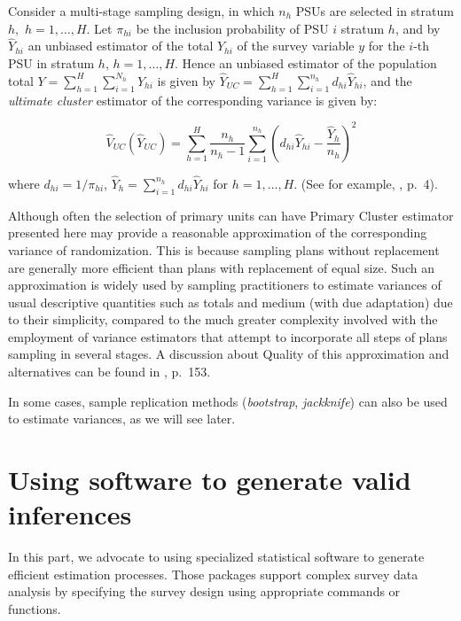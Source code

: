 \documentclass[
  12pt,
]{book}
\begin{document}
Consider a multi-stage sampling design, in which \(n_{h}\) PSUs are selected in stratum \(h,\) \(h=1,\ldots ,H\). Let \(\pi_{hi}\) be the inclusion probability of PSU \(i\) stratum \(h\), and by \(\widehat{Y}_{hi}\) an unbiased estimator of the total \(Y_{hi}\) of the survey variable \(y\) for the \(i\)-th PSU in stratum \(h\), \(h=1,\ldots ,H\). Hence an unbiased estimator of the population total \(Y = \sum_{h=1}^{H} \sum_{i=1}^{N_{h}} Y_{hi}\) is given by \(\widehat{Y}_{UC} = \sum_{h=1}^{H} \sum_{i=1}^{n_{h}} d_{hi} \widehat{Y}_{hi}\), and the \emph{ultimate cluster} estimator of the corresponding variance is given by:

\[
\widehat{V}_{UC} \left( \widehat{Y}_{UC}\right) = \sum_{h=1}^{H} \frac{n_{h}}
{n_{h}-1} \sum_{i=1}^{n_{h}} \left( d_{hi} \widehat{Y}_{hi} - \frac{\widehat{Y}_{h}}{n_{h}} \right) ^{2}
\]

where \(d_{hi} = 1 / \pi_{hi}\), \(\widehat{Y}_{h} = \sum_{i=1}^{n_{h}} d_{hi} \widehat{Y}_{hi}\) for \(h=1,\ldots ,H\). (See for example, \citep{Shah1993}, p.~4).

Although often the selection of primary units can have Primary Cluster estimator presented here may provide a reasonable approximation of the corresponding variance of randomization. This is because sampling plans without replacement are generally more efficient than plans with replacement of equal size. Such an approximation is widely used by sampling practitioners to estimate variances of usual descriptive quantities such as totals and medium (with due adaptation) due to their simplicity, compared to the much greater complexity involved with the employment of variance estimators that attempt to incorporate all steps of plans sampling in several stages. A discussion about Quality of this approximation and alternatives can be found in \citep{SSW92}, p.~153.

In some cases, sample replication methods (\emph{bootstrap}, \emph{jackknife}) can also be used to estimate variances, as we will see later.

\hypertarget{using-software-to-generate-valid-inferences}{%
\section{Using software to generate valid inferences}\label{using-software-to-generate-valid-inferences}}

In this part, we advocate to using specialized statistical software to generate efficient estimation processes. Those packages support complex survey data analysis by specifying the survey design using appropriate commands or functions.
\end{document}
